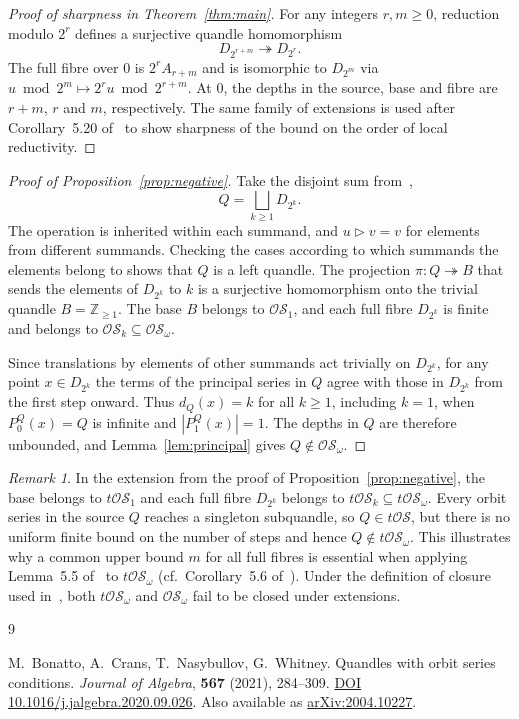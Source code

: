 \documentclass[11pt,a4paper]{article}
\theoremstyle{remark}
\newtheorem{remark}[theorem]{Remark}
\newcommand{\OS}{\mathcal{OS}}
\newcommand{\tOS}{t\mathcal{OS}}
\newcommand{\Z}{\mathbb{Z}}
\newcommand{\conj}{\triangleright}
\begin{document}
\begin{proof}[Proof of sharpness in Theorem~\ref{thm:main}]
For any integers \(r,m\ge 0\), reduction modulo \(2^r\) defines a
surjective quandle homomorphism
\[
  D_{2^{r+m}}\twoheadrightarrow D_{2^r}.
\]
The full fibre over \(0\) is \(2^r A_{r+m}\) and is isomorphic to
\(D_{2^m}\) via \(u\bmod 2^m\mapsto 2^r u\bmod 2^{r+m}\).
At \(0\), the depths in the source, base and fibre are \(r+m\), \(r\)
and \(m\), respectively. The same family of extensions is used after
Corollary~5.20 of~\cite{BCNW} to show sharpness of the bound on the order
of local reductivity.
\end{proof}

\begin{proof}[Proof of Proposition~\ref{prop:negative}]
Take the disjoint sum from~\cite[Example~4.2]{BCNW},
\[
  Q=\bigsqcup_{k\ge 1}D_{2^k}.
\]
The operation is inherited within each summand, and \(u\conj v=v\)
for elements from different summands.
Checking the cases according to which summands the elements belong to
shows that \(Q\) is a left quandle. The projection
\(\pi\colon Q\twoheadrightarrow B\) that sends the elements of
\(D_{2^k}\) to \(k\) is a surjective homomorphism onto the trivial
quandle \(B=\Z_{\ge 1}\). The base \(B\) belongs to \(\OS_1\), and each
full fibre \(D_{2^k}\) is finite and belongs to \(\OS_k\subseteq\OS_\omega\).

Since translations by elements of other summands act trivially on
\(D_{2^k}\), for any point \(x\in D_{2^k}\) the terms of the principal
series in \(Q\) agree with those in \(D_{2^k}\) from the first step onward.
Thus \(d_Q(x)=k\) for all \(k\ge 1\), including \(k=1\), when
\(P_0^Q(x)=Q\) is infinite and \(|P_1^Q(x)|=1\). The depths in \(Q\)
are therefore unbounded, and Lemma~\ref{lem:principal} gives
\(Q\notin\OS_\omega\).
\end{proof}

\begin{remark}
In the extension from the proof of Proposition~\ref{prop:negative},
the base belongs to \(\tOS_1\) and each full fibre \(D_{2^k}\) belongs
to \(\tOS_k\subseteq\tOS_\omega\). Every orbit series in the source
\(Q\) reaches a singleton subquandle, so \(Q\in\tOS\), but there is
no uniform finite bound on the number of steps and hence
\(Q\notin\tOS_\omega\). This illustrates why a common upper bound
\(m\) for all full fibres is essential when applying
Lemma~5.5 of~\cite{BCNW} to \(\tOS_\omega\) (cf.\ Corollary~5.6
of~\cite{BCNW}). Under the definition of closure used
in~\cite[Section~2.2]{BCNW}, both \(\tOS_\omega\) and \(\OS_\omega\)
fail to be closed under extensions.
\end{remark}

\begin{thebibliography}{9}
\raggedright
{}
M.~Bonatto, A.~Crans, T.~Nasybullov, G.~Whitney.
\newblock Quandles with orbit series conditions.
\newblock \emph{Journal of Algebra}, \textbf{567} (2021), 284--309.
\newblock \href{https://doi.org/10.1016/j.jalgebra.2020.09.026}{DOI 10.1016/j.jalgebra.2020.09.026}.
\newblock Also available as
\href{https://arxiv.org/abs/2004.10227}{arXiv:2004.10227}.
\end{thebibliography}
\end{document}
